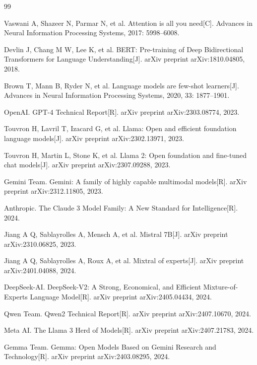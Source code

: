 \begin{thebibliography}{99}

 Vaswani A, Shazeer N, Parmar N, et al. Attention is all you need[C]. Advances in Neural Information Processing Systems, 2017: 5998--6008.

 Devlin J, Chang M W, Lee K, et al. BERT: Pre-training of Deep Bidirectional Transformers for Language Understanding[J]. arXiv preprint arXiv:1810.04805, 2018.

 Brown T, Mann B, Ryder N, et al. Language models are few-shot learners[J]. Advances in Neural Information Processing Systems, 2020, 33: 1877--1901.

 OpenAI. GPT-4 Technical Report[R]. arXiv preprint arXiv:2303.08774, 2023.

 Touvron H, Lavril T, Izacard G, et al. Llama: Open and efficient foundation language models[J]. arXiv preprint arXiv:2302.13971, 2023.

 Touvron H, Martin L, Stone K, et al. Llama 2: Open foundation and fine-tuned chat models[J]. arXiv preprint arXiv:2307.09288, 2023.

 Gemini Team. Gemini: A family of highly capable multimodal models[R]. arXiv preprint arXiv:2312.11805, 2023.

 Anthropic. The Claude 3 Model Family: A New Standard for Intelligence[R]. 2024.

 Jiang A Q, Sablayrolles A, Mensch A, et al. Mistral 7B[J]. arXiv preprint arXiv:2310.06825, 2023.

 Jiang A Q, Sablayrolles A, Roux A, et al. Mixtral of experts[J]. arXiv preprint arXiv:2401.04088, 2024.

 DeepSeek-AI. DeepSeek-V2: A Strong, Economical, and Efficient Mixture-of-Experts Language Model[R]. arXiv preprint arXiv:2405.04434, 2024.

 Qwen Team. Qwen2 Technical Report[R]. arXiv preprint arXiv:2407.10670, 2024.

 Meta AI. The Llama 3 Herd of Models[R]. arXiv preprint arXiv:2407.21783, 2024.

 Gemma Team. Gemma: Open Models Based on Gemini Research and Technology[R]. arXiv preprint arXiv:2403.08295, 2024.


\end{thebibliography}
